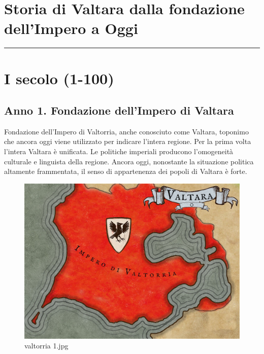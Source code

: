 \section{Storia di Valtara dalla fondazione dell'Impero a
Oggi}\label{storia-di-valtara-dalla-fondazione-dellimpero-a-oggi}

\begin{center}\rule{0.5\linewidth}{0.5pt}\end{center}

\section{I secolo (1-100)}\label{i-secolo-1-100}

\subsection{Anno 1. Fondazione dell'Impero di
Valtara}\label{anno-1.-fondazione-dellimpero-di-valtara}

Fondazione dell'Impero di Valtorria, anche conosciuto come Valtara,
toponimo che ancora oggi viene utilizzato per indicare l'intera regione.
Per la prima volta l'intera Valtara è unificata. Le politiche imperiali
producono l'omogeneità culturale e linguista della regione. Ancora oggi,
nonostante la situazione politica altamente frammentata, il senso di
appartenenza dei popoli di Valtara è forte.

\begin{figure}
\centering
\includegraphics{valtorria_1.jpg}
\caption{valtorria 1.jpg}
\end{figure}

